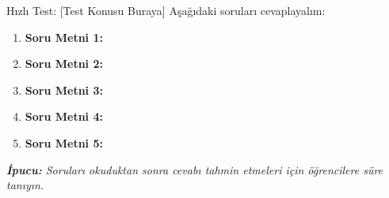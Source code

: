 % 
% 

\begin{frame}{Hızlı Test: [Test Konusu Buraya]}
    \justifying{}
    Aşağıdaki soruları cevaplayalım:

    \vspace{1em}
    \begin{enumerate}
        \item \textbf{Soru Metni 1:} 
        
        \item \textbf{Soru Metni 2:} 
        
        \item \textbf{Soru Metni 3:} 
        
        \item \textbf{Soru Metni 4:} 
        
        \item \textbf{Soru Metni 5:} 
    \end{enumerate}

    \vspace{1.5em}
    \centering
    \textit{\small \textbf{İpucu:} Soruları okuduktan sonra cevabı tahmin etmeleri için öğrencilere süre tanıyın.}
\end{frame}
